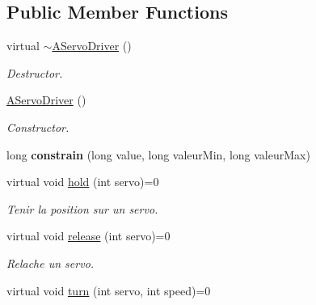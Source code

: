 \subsection*{Public Member Functions}
\begin{DoxyCompactItemize}
\item 
\mbox{\label{classAServoDriver_a3dbde2c92b140d02e520cf646bdd47f4}} 
virtual \hyperlink{classAServoDriver_a3dbde2c92b140d02e520cf646bdd47f4}{$\sim$\+A\+Servo\+Driver} ()
\begin{DoxyCompactList}\small\item\em Destructor. \end{DoxyCompactList}\item 
\mbox{\label{classAServoDriver_a6f11bdbeabd16744ddfd24edcf24db3d}} 
\hyperlink{classAServoDriver_a6f11bdbeabd16744ddfd24edcf24db3d}{A\+Servo\+Driver} ()
\begin{DoxyCompactList}\small\item\em Constructor. \end{DoxyCompactList}\item 
\mbox{\label{classAServoDriver_ad21637417b10b9f06418e070428a8b8d}} 
long {\bfseries constrain} (long value, long valeur\+Min, long valeur\+Max)
\item 
\mbox{\label{classAServoDriver_af90488fb6a2ea3149f4bf68ae01e61b2}} 
virtual void \hyperlink{classAServoDriver_af90488fb6a2ea3149f4bf68ae01e61b2}{hold} (int servo)=0
\begin{DoxyCompactList}\small\item\em Tenir la position sur un servo. \end{DoxyCompactList}\item 
\mbox{\label{classAServoDriver_a9005ceeeecc056474f1ae6e54ce8ba23}} 
virtual void \hyperlink{classAServoDriver_a9005ceeeecc056474f1ae6e54ce8ba23}{release} (int servo)=0
\begin{DoxyCompactList}\small\item\em Relache un servo. \end{DoxyCompactList}\item 
\mbox{\label{classAServoDriver_aea0af472e44c21328bf4ebb7203ca416}} 
virtual void \hyperlink{classAServoDriver_aea0af472e44c21328bf4ebb7203ca416}{turn} (int servo, int speed)=0

\end{DoxyCompactItemize}
